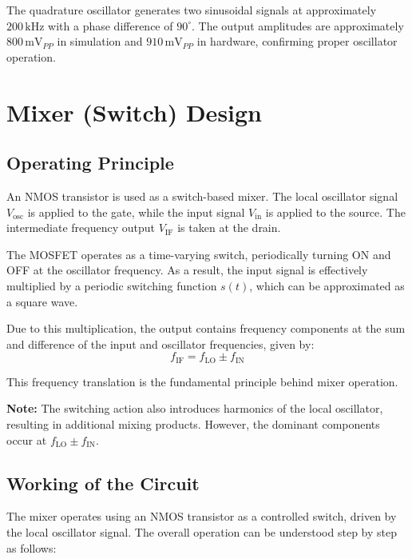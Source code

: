 \documentclass[conference]{IEEEtran}
\begin{document}
The quadrature oscillator generates two sinusoidal signals at approximately $200\,\text{kHz}$ with a phase difference of $90^\circ$. The output amplitudes are approximately $800\,\text{mV}_{PP}$ in simulation and $910\,\text{mV}_{PP}$ in hardware, confirming proper oscillator operation.

\section{Mixer (Switch) Design}
\subsection{Operating Principle}

An NMOS transistor is used as a switch-based mixer. The local oscillator signal $V_{\text{osc}}$ is applied to the gate, while the input signal $V_{\text{in}}$ is applied to the source. The intermediate frequency output $V_{\text{IF}}$ is taken at the drain.

The MOSFET operates as a time-varying switch, periodically turning ON and OFF at the oscillator frequency. As a result, the input signal is effectively multiplied by a periodic switching function $s(t)$, which can be approximated as a square wave.

Due to this multiplication, the output contains frequency components at the sum and difference of the input and oscillator frequencies, given by:
\begin{equation}
f_{\text{IF}} = f_{\text{LO}} \pm f_{\text{IN}}
\end{equation}

This frequency translation is the fundamental principle behind mixer operation.

\bigskip

\noindent \textbf{Note:} The switching action also introduces harmonics of the local oscillator, resulting in additional mixing products. However, the dominant components occur at $f_{\text{LO}} \pm f_{\text{IN}}$.

\subsection{Working of the Circuit}

The mixer operates using an NMOS transistor as a controlled switch, driven by the local oscillator signal. The overall operation can be understood step by step as follows:
\end{document}
